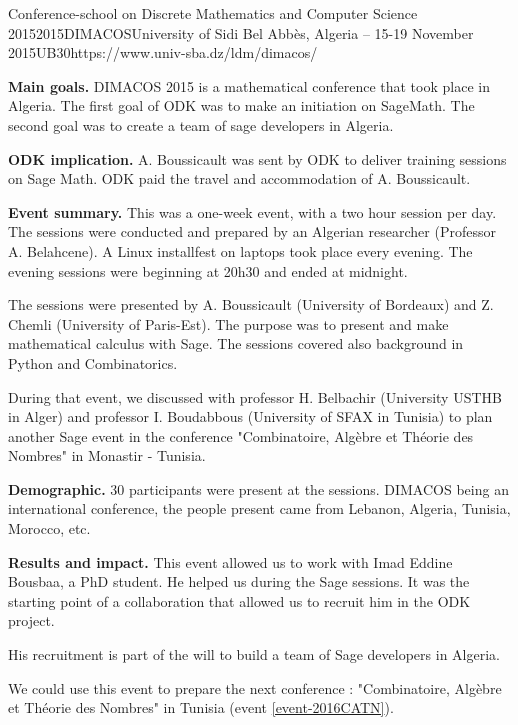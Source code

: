 \begin{event}{Conference-school on Discrete Mathematics and Computer Science 2015}{2015DIMACOS}{University of Sidi Bel Abbès, Algeria -- 15-19 November 2015}{UB}{30}{https://www.univ-sba.dz/ldm/dimacos/}

\textbf{Main goals.} DIMACOS 2015 is a mathematical conference that took place in
Algeria. The first goal of ODK was to make an initiation on SageMath.
The second goal was to create a team of sage developers in Algeria.

\textbf{ODK implication.} A. Boussicault was sent by ODK to deliver
training sessions on
Sage Math. ODK paid the travel and accommodation of A. Boussicault.

\textbf{Event summary.}
This was a one-week event, with a two hour session per day.
The sessions were conducted and prepared by
an Algerian researcher (Professor A. Belahcene).
A Linux installfest on laptops took place every evening.
The evening sessions were beginning at 20h30 and ended at midnight.

The sessions were presented by A. Boussicault (University of Bordeaux) and
Z. Chemli (University of Paris-Est). The purpose was to present and make
mathematical calculus with Sage. The sessions covered also background
in Python and Combinatorics.

During that event, we discussed with professor H. Belbachir
(University USTHB in Alger) and professor I. Boudabbous (University of
SFAX in Tunisia) to plan another Sage event in the conference
"Combinatoire, Algèbre et Théorie des Nombres" in Monastir - Tunisia.


\textbf{Demographic.} 30 participants were present at the sessions.
DIMACOS being an international conference, the people present came from Lebanon, Algeria, Tunisia, Morocco, etc.

\textbf{Results and impact.}
This event allowed us to work with Imad Eddine Bousbaa, a PhD student.
He helped us during the Sage sessions.
It was the starting point of a collaboration that allowed us to recruit him in
the ODK project.

His recruitment is part of the will to build a team of Sage developers in Algeria.

We could use this event to prepare the next conference : "Combinatoire, Algèbre et Théorie des Nombres"
in Tunisia (event \ref{event-2016CATN}).


\end{event}
